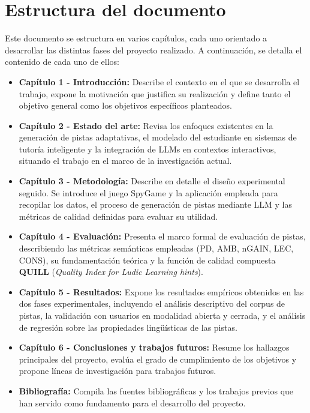 \documentclass[../main.tex]{subfiles}
\begin{document}
\section{Estructura del documento}
Este documento se estructura en varios capítulos, cada uno orientado a desarrollar las distintas fases del proyecto realizado. A continuación, se detalla el contenido de cada uno de ellos:

\begin{itemize}
    \item \textbf{Capítulo 1 - Introducción:} Describe el contexto en el que se desarrolla el trabajo, expone la motivación que justifica su realización y define tanto el objetivo general como los objetivos específicos planteados.

    \item \textbf{Capítulo 2 - Estado del arte:} Revisa los enfoques existentes en la generación de pistas adaptativas, el modelado del estudiante en sistemas de tutoría inteligente y la integración de LLMs en contextos interactivos, situando el trabajo en el marco de la investigación actual.

    \item \textbf{Capítulo 3 - Metodología:} Describe en detalle el diseño experimental seguido. Se introduce el juego SpyGame y la aplicación empleada para recopilar los datos, el proceso de generación de pistas mediante LLM y las métricas de calidad definidas para evaluar su utilidad.

    \item \textbf{Capítulo 4 - Evaluación:} Presenta el marco formal de evaluación de pistas, describiendo las métricas semánticas empleadas (PD, AMB, nGAIN, LEC, CONS), su fundamentación teórica y la función de calidad compuesta \textbf{QUILL} (\textit{Quality Index for Ludic Learning hints}).

    \item \textbf{Capítulo 5 - Resultados:} Expone los resultados empíricos obtenidos en las dos fases experimentales, incluyendo el análisis descriptivo del corpus de pistas, la validación con usuarios en modalidad abierta y cerrada, y el análisis de regresión sobre las propiedades lingüísticas de las pistas.

    \item \textbf{Capítulo 6 - Conclusiones y trabajos futuros:} Resume los hallazgos principales del proyecto, evalúa el grado de cumplimiento de los objetivos y propone líneas de investigación para trabajos futuros.

    \item \textbf{Bibliografía:} Compila las fuentes bibliográficas y los trabajos previos que han servido como fundamento para el desarrollo del proyecto.
\end{itemize}
\end{document}
